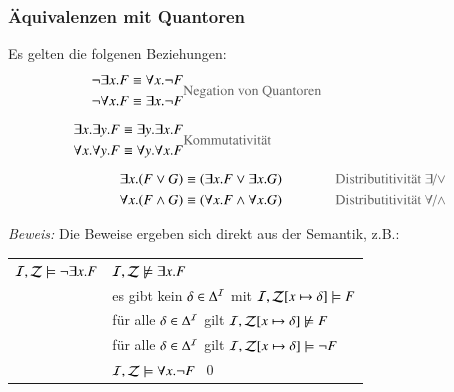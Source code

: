 \documentclass[onlymath]{beamer}
\begin{document}
\begin{frame}\frametitle{Äquivalenzen mit Quantoren}

Es gelten die folgenen Beziehungen:
\begin{align*}
\begin{split}
\neg\exists x.F &\equiv \forall x.\neg F\\
\neg\forall x.F &\equiv \exists x.\neg F
\end{split}
& \text{\textcolor{devilscss}{Negation von Quantoren}}\\[1ex]
%
\begin{split}
\exists x.\exists y.F &\equiv \exists y.\exists x.F\\
\forall x.\forall y.F &\equiv \forall y.\forall x.F
\end{split}
& \text{\textcolor{devilscss}{Kommutativität}}\\[1ex]
%
\exists x.(F\vee G) &\equiv (\exists x.F\vee \exists x.G) & \text{\textcolor{devilscss}{Distributitivität $\exists$/$\vee$}}\\
\forall x.(F\wedge G) &\equiv (\forall x.F\wedge \forall x.G) & \text{\textcolor{devilscss}{Distributitivität $\forall$/$\wedge$}}
\end{align*}

\pause\emph{Beweis:} Die Beweise ergeben sich direkt aus der Semantik, z.B.:\bigskip

\begin{tabular}{r@{ gdw. }l}
$\mathcal{I},\mathcal{Z}\models \neg\exists x.F$
& $\mathcal{I},\mathcal{Z}\not\models \exists x.F$\pause\\[-0.9ex]
& es gibt kein $\delta\in\Delta^{\mathcal{I}}$ mit $\mathcal{I},\mathcal{Z}[x\mapsto\delta]\models F$\pause\\[-0.9ex]
& für alle $\delta\in\Delta^{\mathcal{I}}$ gilt $\mathcal{I},\mathcal{Z}[x\mapsto\delta]\not\models F$\pause\\[-0.9ex]
& für alle $\delta\in\Delta^{\mathcal{I}}$ gilt $\mathcal{I},\mathcal{Z}[x\mapsto\delta]\models \neg F$\pause\\[-0.9ex]
& $\mathcal{I},\mathcal{Z}\models \forall x.\neg F$\hspace{4cm}~\qed
\end{tabular}

\end{frame}
\end{document}
